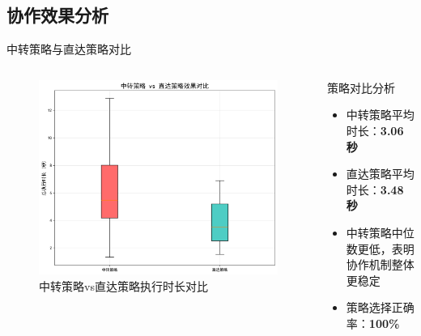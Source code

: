 \documentclass[
10pt,
aspectratio=169,
]{beamer}
\begin{document}
\subsection{协作效果分析}

\begin{frame}{中转策略与直达策略对比}
    \begin{columns}
        \begin{column}{0.6\textwidth}
            \begin{figure}
                \centering
                \includegraphics[width=\textwidth]{analysis_results/strategy_comparison_20250617_081456.png}
                \caption{中转策略vs直达策略执行时长对比}
            \end{figure}
        \end{column}
        \begin{column}{0.4\textwidth}
            \begin{alertblock}{策略对比分析}
                \begin{itemize}
                    \item 中转策略平均时长：\textbf{3.06秒}
                    \item 直达策略平均时长：\textbf{3.48秒}
                    \item 中转策略中位数更低，表明协作机制整体更稳定
                    \item 策略选择正确率：\textbf{100\%}
                \end{itemize}
            \end{alertblock}
            

\end{column}
\end{columns}
\end{frame}
\end{document}

